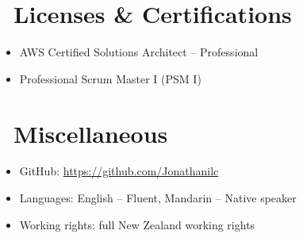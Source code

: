 \documentclass{resume}
\begin{document}
\section{\faHeartO\ Licenses \& Certifications}
\begin{itemize}[parsep=0.5ex]
  \item AWS Certified Solutions Architect – Professional
  \item Professional Scrum Master I (PSM I)
\end{itemize}


\section{\faInfo\ Miscellaneous}
\begin{itemize}[parsep=0.5ex]
  \item GitHub: \url{https://github.com/Jonathanilc}
  \item Languages: English – Fluent, Mandarin – Native speaker
  \item Working rights: full New Zealand working rights
\end{itemize}
\end{document}
